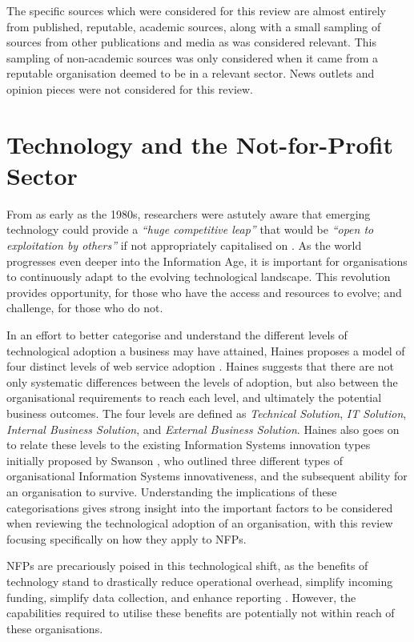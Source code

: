 The specific sources which were considered for this review are almost entirely from published, reputable, academic sources, along with a small sampling of sources from other publications and media as was considered relevant. This sampling of non-academic sources was only considered when it came from a reputable organisation deemed to be in a relevant sector. News outlets and opinion pieces were not considered for this review.

\section{Technology and the Not-for-Profit Sector}

From as early as the 1980s, researchers were astutely aware that emerging technology could provide a \emph{“huge competitive leap”} that would be \emph{“open to exploitation by others”} if not appropriately capitalised on \cite{benjamin1983information}. As the world progresses even deeper into the Information Age, it is important for organisations to continuously adapt to the evolving technological landscape. This revolution provides opportunity, for those who have the access and resources to evolve; and challenge, for those who do not.

In an effort to better categorise and understand the different levels of technological adoption a business may have attained, Haines proposes a model of four distinct levels of web service adoption \cite{haines2003levels}. Haines suggests that there are not only systematic differences between the levels of adoption, but also between the organisational requirements to reach each level, and ultimately the potential business outcomes. The four levels are defined as \emph{Technical Solution}, \emph{IT Solution}, \emph{Internal Business Solution}, and \emph{External Business Solution}. Haines also goes on to relate these levels to the existing Information Systems innovation types initially proposed by Swanson \cite{swanson1994information}, who outlined three different types of organisational Information Systems innovativeness, and the subsequent ability for an organisation to survive. Understanding the implications of these categorisations gives strong insight into the important factors to be considered when reviewing the technological adoption of an organisation, with this review focusing specifically on how they apply to NFPs.

NFPs are precariously poised in this technological shift, as the benefits of technology stand to drastically reduce operational overhead, simplify incoming funding, simplify data collection, and enhance reporting \cite{boles2013technology} \cite{bopp2017disempowered}. However, the capabilities required to utilise these benefits are potentially not within reach of these organisations.

